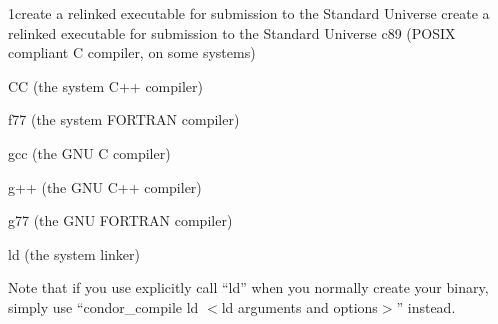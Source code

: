 \begin{ManPage}{}{1}{create a relinked executable for submission to the Standard Universe create a relinked executable for submission to the Standard Universe}
     c89 (POSIX compliant C compiler, on some systems) 

     CC (the system C++ compiler) 

     f77 (the system FORTRAN compiler) 

     gcc (the GNU C compiler) 

     g++ (the GNU C++ compiler) 

     g77 (the GNU FORTRAN compiler) 

     ld (the system linker) 

Note that if you use explicitly call ``ld'' when you normally create your binary, simply use ``condor\_compile ld $<$ld arguments
and options$>$'' instead. 

\end{ManPage}
